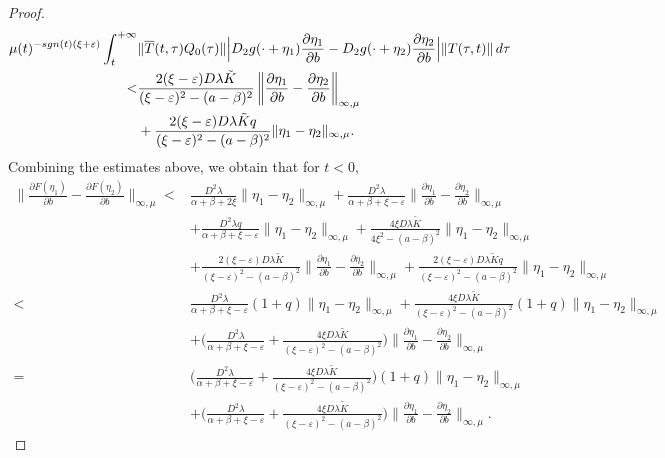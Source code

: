 \documentclass[10pt,a4paper]{amsart}
\begin{document}
\begin{proof}
\begin{equation*}
\begin{split}
\mu(t)^{-\textnormal{sgn}(t)(\xi+\varepsilon)} \int_{t}^{+\infty} & \|\overline{T}(t,\tau)Q_0(\tau)\|
\Big| D_2g(\cdot + \eta_1) \frac{\partial\eta_1}{\partial b} - D_2g(\cdot + \eta_2) \frac{\partial\eta_2}{\partial b} \Big|
\|T(\tau,t)\| \, d\tau
\\
< & \frac{2(\xi-\varepsilon)D\lambda\tilde{K}}{(\xi-\varepsilon)^2 - (a-\beta)^2} \left\| \frac{\partial\eta_1}{\partial b} - \frac{\partial\eta_2}{\partial b} \right\|_{\infty,\mu} \\
&+ \frac{2(\xi-\varepsilon)D\lambda\tilde{K}q}{(\xi-\varepsilon)^2 - (a-\beta)^2} \|\eta_1 - \eta_2\|_{\infty,\mu}.
\end{split}
\end{equation*}
Combining the estimates above, we obtain that for $t < 0$,
\begin{align}
        \Big\|\frac{\partial F(\eta_1)}{\partial b}-\frac{\partial F(\eta_2)}{\partial b}\Big\|_{\infty,\mu} <& \frac{D^2\lambda}{\alpha+\beta+2\xi}\|\eta_1-\eta_2\|_{\infty,\mu}+\frac{D^2\lambda}{\alpha+\beta+\xi-\varepsilon}\Big\|\frac{\partial\eta_1}{\partial b}-\frac{\partial\eta_2}{\partial b}\Big\|_{\infty,\mu}\nonumber\\
        &+\frac{D^2\lambda q}{\alpha+\beta+\xi-\varepsilon}\|\eta_1-\eta_2\|_{\infty,\mu} + \frac{4\xi D\lambda\tilde{K}}{4\xi^2-(a-\beta)^2}\|\eta_1-\eta_2\|_{\infty,\mu}\nonumber\\
        &+ \frac{2(\xi-\varepsilon)D\lambda\tilde{K}}{(\xi-\varepsilon)^2-(a-\beta)^2}\Big\|\frac{\partial\eta_1}{\partial b}-\frac{\partial\eta_2}{\partial b}\Big\|_{\infty,\mu} + \frac{2(\xi-\varepsilon)D\lambda\tilde{K}q}{(\xi-\varepsilon)^2-(a-\beta)^2}\|\eta_1-\eta_2\|_{\infty,\mu}\nonumber\\
        <& \frac{D^2\lambda}{\alpha+\beta+\xi-\varepsilon}(1+q)\|\eta_1-\eta_2\|_{\infty,\mu} + \frac{4\xi D\lambda\tilde{K}}{(\xi-\varepsilon)^2-(a-\beta)^2}(1+q)\|\eta_1-\eta_2\|_{\infty,\mu}\nonumber\\
        &+ \Big(\frac{D^2\lambda}{\alpha+\beta+\xi-\varepsilon}+\frac{4\xi D\lambda\tilde{K}}{(\xi-\varepsilon)^2-(a-\beta)^2}\Big)\Big\|\frac{\partial\eta_1}{\partial b} - \frac{\partial\eta_2}{\partial b}\Big\|_{\infty,\mu}\nonumber\\
        =& \Big(\frac{D^2\lambda}{\alpha+\beta+\xi-\varepsilon}+\frac{4\xi D\lambda\tilde{K}}{(\xi-\varepsilon)^2-(a-\beta)^2}\Big)(1+q)\|\eta_1-\eta_2\|_{\infty,\mu}\nonumber\\
        &+ \Big(\frac{D^2\lambda}{\alpha+\beta+\xi-\varepsilon}+\frac{4\xi D\lambda\tilde{K}}{(\xi-\varepsilon)^2-(a-\beta)^2}\Big)\Big\|\frac{\partial\eta_1}{\partial b} - \frac{\partial\eta_2}{\partial b}\Big\|_{\infty,\mu}.\label{Dfn12-tmenorcero}
\end{align}


\end{proof}
\end{document}

